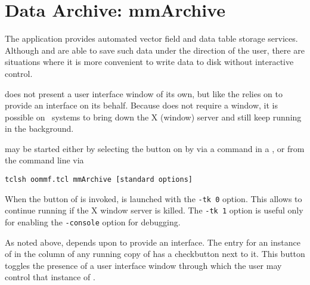 \section{Data Archive: mmArchive}\label{sec:mmarchive}%

\begin{center}
\end{center}

The application  provides automated vector field and data
table storage services.  Although
and
are able to save such data under the direction of the user, there are
situations where it is more convenient to write data to disk without
interactive control.

 does not present a user interface window of its own,
but like the {}
relies on {} to
provide an interface on its behalf.  Because  does not
require a window, it is possible on \Unix\ systems to bring down the X
(window) server and still keep
 running in the background.

 may be started either by selecting the
 button on 
by  via a
command in a 
{},
or from the command line via
\begin{verbatim}
tclsh oommf.tcl mmArchive [standard options]
\end{verbatim}

When the  button of  is invoked,
 is launched with the {{\tt -tk 0}} option.
This allows  to continue running if the X
window server is killed.  The {{\tt -tk 1}} option is useful
only for enabling the {{\tt -console}} option for debugging.

As noted above,  depends upon
 to provide an interface.
The entry for an instance of  in the
 column of any running copy of  has a
checkbutton next to it.  This button toggles the presence of a user
interface window through which the user may control that instance of
.

